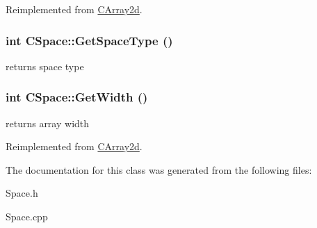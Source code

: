 Reimplemented from \hyperlink{classCArray2d_ae019e1beca716a4ea7d368e342fe23a1}{CArray2d}.\hypertarget{classCSpace_ae700fc8fa63e62dd559245e832614c65}{
\subsubsection[{GetSpaceType}]{\setlength{\rightskip}{0pt plus 5cm}int CSpace::GetSpaceType ()}}
\label{classCSpace_ae700fc8fa63e62dd559245e832614c65}
returns space type \hypertarget{classCSpace_a0358e524cecae683cfbcf526ea99d818}{
\subsubsection[{GetWidth}]{\setlength{\rightskip}{0pt plus 5cm}int CSpace::GetWidth ()}}
\label{classCSpace_a0358e524cecae683cfbcf526ea99d818}
returns array width 

Reimplemented from \hyperlink{classCArray2d_a7cfeb98b3112d1e147464a7ec2374579}{CArray2d}.

The documentation for this class was generated from the following files:\begin{DoxyCompactItemize}
\item 
Space.h\item 
Space.cpp\end{DoxyCompactItemize}
